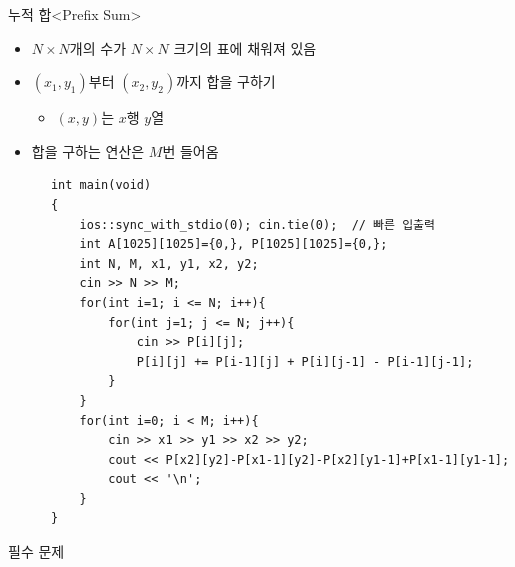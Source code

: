 \begin{frame}[fragile]{누적 합}{<Prefix Sum>}
  \begin{center}
  \end{center}
  \vspace{2mm}
  \begin{twocol}
    \begin{itemize}
      \item $N{\times}N$개의 수가 $N{\times}N$ 크기의 표에 채워져 있음
      \item $(x_1, y_1)$부터 $(x_2, y_2)$까지 합을 구하기
      \begin{itemize}
        \item $(x, y)$는 $x$행 $y$열
      \end{itemize}
      \item 합을 구하는 연산은 $M$번 들어옴
    \end{itemize}
  \colsplit
    \begin{verbatim}
      int main(void)
      {
          ios::sync_with_stdio(0); cin.tie(0);  // 빠른 입출력
          int A[1025][1025]={0,}, P[1025][1025]={0,};
          int N, M, x1, y1, x2, y2;
          cin >> N >> M;
          for(int i=1; i <= N; i++){
              for(int j=1; j <= N; j++){
                  cin >> P[i][j];
                  P[i][j] += P[i-1][j] + P[i][j-1] - P[i-1][j-1];
              }
          }
          for(int i=0; i < M; i++){
              cin >> x1 >> y1 >> x2 >> y2;
              cout << P[x2][y2]-P[x1-1][y2]-P[x2][y1-1]+P[x1-1][y1-1];
              cout << '\n';
          }
      }
    \end{verbatim}
  \end{twocol}
\end{frame}


\begin{frame}{필수 문제}
\end{frame}


